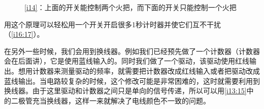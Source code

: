 \begin{figure}[!ht]
\begin{center}
\qquad
{}
\end{center}
\caption{\ref{i14}\protect{}：上面的开关能控制两个火把，而下面的开关只能控制一个火把}
\label{i13:15}
\end{figure}

用这个原理可以轻松用一个开关开启很多1秒计时器并使它们互不干扰（\autoref{i16:17}）。

\begin{figure}[!ht]
\begin{center}
\end{center}
\caption{}
\label{i16:17}
\end{figure}

在另外一些时候，我们会用到换线器。例如我们已经预先做了一个计数器（计数器会在后面讲），它是使用蓝线输入的。同时我们做了一个驱动，该驱动使用红线输出。想用计数器来测量驱动的频率，就需要把计数器改成红线输入或者把驱动改成蓝线输出。当电路较复杂的时候，这个修改可能是非常困难的，这时就需要利用到换线器。由于这里驱动和计数器之间只是单向的信号传递，所以可以用\autoref{i13:15}中的二极管充当换线器，这样一来就解决了电线颜色不一致的问题。

